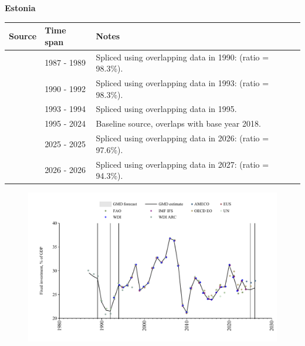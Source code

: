 \documentclass[12pt,a4paper,landscape]{article}
\begin{document}
\begin{adjustbox}{max totalsize={\paperwidth}{\paperheight},center}
\begin{minipage}[t][\textheight][t]{\textwidth}
\vspace*{0.5cm}
{}
\begin{center}
{\Large\bfseries Estonia}
\end{center}
\vspace{0.5cm}
\begin{table}[H]
\centering
\small
\begin{tabular}{|l|l|l|}
\hline
\textbf{Source} & \textbf{Time span} & \textbf{Notes} \\
\hline
\rowcolor{white}\cite{WDI_ARC}& 1987 - 1989 &Spliced using overlapping data in 1990: (ratio = 98.3\%).\\
\rowcolor{lightgray}\cite{UN}& 1990 - 1992 &Spliced using overlapping data in 1993: (ratio = 98.3\%).\\
\rowcolor{white}\cite{WDI}& 1993 - 1994 &Spliced using overlapping data in 1995.\\
\rowcolor{lightgray}\cite{EUS}& 1995 - 2024 &Baseline source, overlaps with base year 2018.\\
\rowcolor{white}\cite{OECD_EO}& 2025 - 2025 &Spliced using overlapping data in 2026: (ratio = 97.6\%).\\
\rowcolor{lightgray}\cite{AMECO}& 2026 - 2026 &Spliced using overlapping data in 2027: (ratio = 94.3\%).\\
\hline
\end{tabular}
\end{table}
\begin{figure}[H]
\centering
\includegraphics[width=\textwidth,height=0.6\textheight,keepaspectratio]{graphs/EST_finv_GDP.pdf}
\end{figure}
\end{minipage}
\end{adjustbox}
\end{document}
